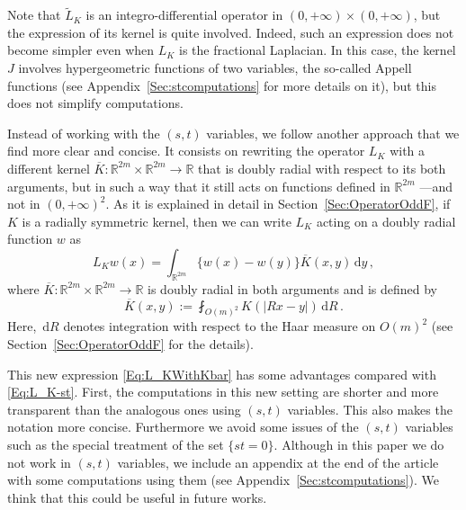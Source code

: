 \documentclass[12pt,reqno]{amsart}
\theoremstyle{definition}
\theoremstyle{remark}
\newcommand{\con}[1]{\mathbb{#1}}
\newcommand{\R}{\con{R}} %
\renewcommand{\d}{\,\mathrm{d}} %
\newcommand{\average}{\fint}
\numberwithin{equation}{section}
\begin{document}
Note that $\widetilde{L}_K$ is an integro-differential operator in $(0,+\infty)\times(0,+\infty)$, but the expression of its kernel is quite involved. Indeed, such an expression does not become simpler even when $L_K$ is the fractional Laplacian. In this case, the kernel $J$ involves hypergeometric functions of two variables, the so-called Appell functions (see Appendix~\ref{Sec:stcomputations} for more details on it), but this does not simplify computations. 



Instead of working with the $(s,t)$ variables, we follow another approach that we find more clear and concise. It consists on rewriting the operator $L_K$ with a different kernel $\overline{K} : \R^{2m}\times \R^{2m} \to \R$ that is doubly radial with respect to its both arguments, but in such a way that it still acts on functions defined in $\R^{2m}$ ---and not in $(0,+\infty)^2$. As it is explained in detail in Section~\ref{Sec:OperatorOddF}, if $K$ is a radially symmetric kernel, then we can write $L_K$ acting on a doubly radial function $w$ as
\begin{equation}
\label{Eq:L_KWithKbar}
L_K w(x) = \int_{\R^{2m}} \{w(x) - w(y)\} \overline{K}(x,y) \d y\,,
\end{equation}
where $\overline{K} : \R^{2m}\times \R^{2m} \to \R$ is doubly radial in both arguments and is defined by
\begin{equation}
\label{Eq:KbarDef'}
\overline{K}(x,y) := \average_{O(m)^2} K(|Rx - y|)\d R\,.
\end{equation}
Here, $\d R$ denotes integration with respect to the Haar measure on $O(m)^2$ (see Section~\ref{Sec:OperatorOddF} for the details).

This new expression \eqref{Eq:L_KWithKbar} has some advantages compared with \eqref{Eq:L_K-st}. First, the computations in this new setting are shorter and more transparent than the analogous ones using $(s,t)$ variables. This also makes the notation more concise. Furthermore we avoid some issues of the $(s,t)$ variables such as the special treatment of the set $\{st=0\}$. Although in this paper we do not work in $(s,t)$ variables, we include an appendix at the end of the article with some computations using them (see Appendix~\ref{Sec:stcomputations}). We think that this could be useful in future works.  
\end{document}
